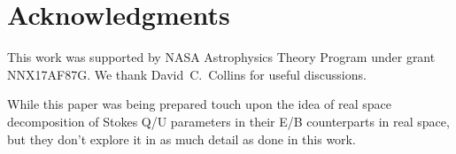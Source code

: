 \section*{Acknowledgments}

This work was supported by NASA Astrophysics Theory Program under grant NNX17AF87G.  We thank David~C.~Collins for useful discussions.  

While this paper was being prepared \cite{2018JCAP...05..059L} touch upon the idea of real space decomposition of Stokes Q/U parameters in their E/B counterparts in real space, but they don't explore it in as much detail as done in this work. 
